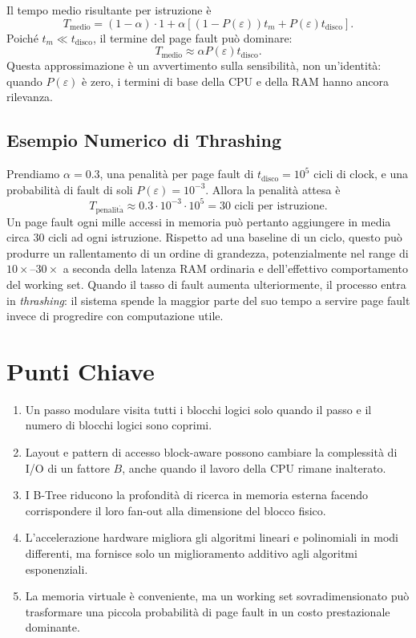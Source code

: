 Il tempo medio risultante per istruzione è
\[
  T_{\mathrm{medio}}=(1-\alpha)\cdot1
  +\alpha\left[(1-P(\varepsilon))t_m
  +P(\varepsilon)t_{\mathrm{disco}}\right].
\]
Poiché $t_m\ll t_{\mathrm{disco}}$, il termine del page fault può dominare:
\[
  T_{\mathrm{medio}}\approx
  \alpha P(\varepsilon)t_{\mathrm{disco}}.
\]
Questa approssimazione è un avvertimento sulla sensibilità, non un'identità: quando $P(\varepsilon)$ è zero, i termini di base della CPU e della RAM hanno ancora rilevanza.

\FloatBarrier
\subsection{Esempio Numerico di Thrashing}
\label{subsec:thrashing}

Prendiamo $\alpha=0.3$, una penalità per page fault di $t_{\mathrm{disco}}=10^5$ cicli di clock, e una probabilità di fault di soli $P(\varepsilon)=10^{-3}$. Allora la penalità attesa è
\[
  T_{\mathrm{penalit\grave{a}}}
  \approx 0.3\cdot10^{-3}\cdot10^5
  =30\text{ cicli per istruzione}.
\]
Un page fault ogni mille accessi in memoria può pertanto aggiungere in media circa $30$ cicli ad ogni istruzione. Rispetto ad una baseline di un ciclo, questo può produrre un rallentamento di un ordine di grandezza, potenzialmente nel range di $10\times$--$30\times$ a seconda della latenza RAM ordinaria e dell'effettivo comportamento del working set. Quando il tasso di fault aumenta ulteriormente, il processo entra in \emph{thrashing}: il sistema spende la maggior parte del suo tempo a servire page fault invece di progredire con computazione utile.

\FloatBarrier
\section{Punti Chiave}
\label{sec:lecture-two-takeaways}

\begin{enumerate}
  \item Un passo modulare visita tutti i blocchi logici solo quando il passo e il numero di blocchi logici sono coprimi.
  \item Layout e pattern di accesso block-aware possono cambiare la complessità di I/O di un fattore $B$, anche quando il lavoro della CPU rimane inalterato.
  \item I B-Tree riducono la profondità di ricerca in memoria esterna facendo corrispondere il loro fan-out alla dimensione del blocco fisico.
  \item L'accelerazione hardware migliora gli algoritmi lineari e polinomiali in modi differenti, ma fornisce solo un miglioramento additivo agli algoritmi esponenziali.
  \item La memoria virtuale è conveniente, ma un working set sovradimensionato può trasformare una piccola probabilità di page fault in un costo prestazionale dominante.
\end{enumerate}
